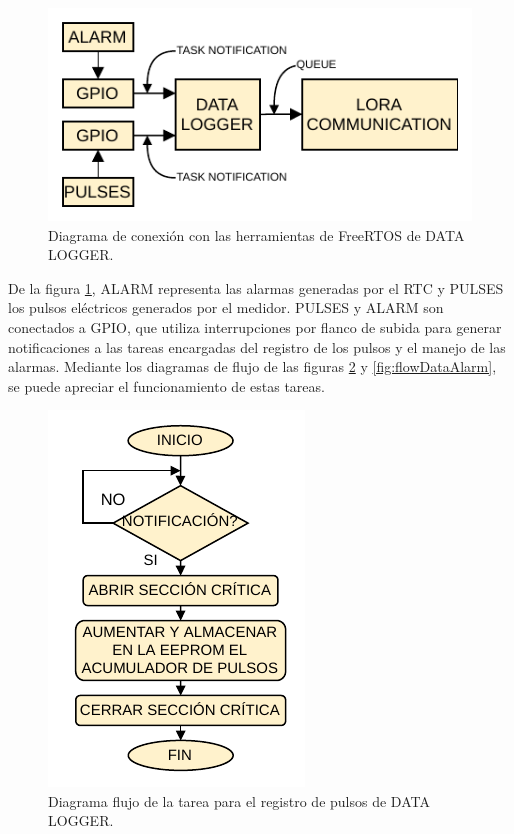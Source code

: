 \begin{figure}[h]
	\centering
	\includegraphics[scale=1]{./Figures/data_logger_com.pdf}
	\caption{Diagrama de conexión con las herramientas de FreeRTOS de DATA LOGGER.}
		\label{fig:dataRTOS}
\end{figure}

De la figura \ref{fig:dataRTOS}, ALARM representa las alarmas generadas por el RTC y PULSES los pulsos eléctricos generados por el medidor. PULSES y ALARM son conectados a GPIO, que utiliza interrupciones por flanco de subida para generar notificaciones a las tareas encargadas del registro de los pulsos y el manejo de las alarmas. Mediante los diagramas de flujo de las figuras \ref{fig:flowDataPulses} y \ref{fig:flowDataAlarm}, se puede apreciar el funcionamiento de estas tareas.

\begin{figure}[h]
	\centering
	\includegraphics[scale=1]{./Figures/data_logger_pulses.pdf}
	\caption{Diagrama flujo de la tarea para el registro de pulsos de DATA LOGGER.}
		\label{fig:flowDataPulses}
\end{figure}

